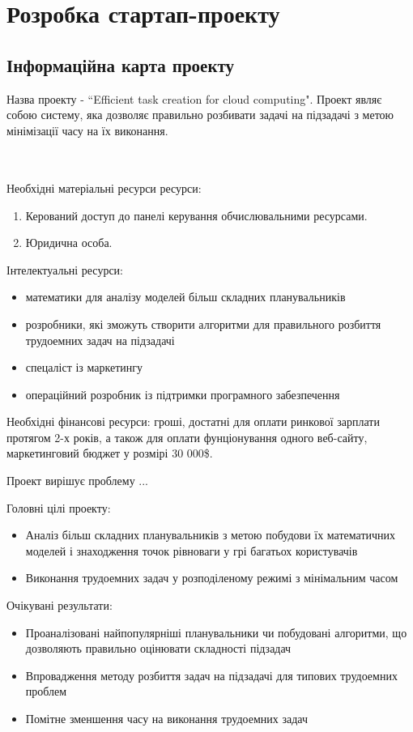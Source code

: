 \chapter{Розробка стартап-проекту}
\section{Інформаційна карта проекту}
Назва проекту - ``Efficient task creation for cloud computing". Проект являє собою систему, яка дозволяє правильно розбивати задачі на підзадачі з метою мінімізації часу на їх виконання.
\begin{tabular}
  {|l|p{8cm}|}
\hline

\end{tabular}
\\
Необхідні матеріальні ресурси ресурси:
\begin{enumerate}
\item Керований доступ до панелі керування обчислювальними ресурсами.
\item Юридична особа.
\end{enumerate}
Інтелектуальні ресурси:
\begin{itemize}
  \item математики для аналізу моделей більш складних планувальників
  \item розробники, які зможуть створити алгоритми для правильного розбиття трудоемних задач на підзадачі
  \item спецаліст із маркетингу
  \item операційний розробник із підтримки програмного забезпечення
\end{itemize}
Необхідні фінансові ресурси: гроші, достатні для оплати ринкової зарплати протягом 2-х років, а також для оплати фунціонування одного веб-сайту, маркетинговий бюджет у розмірі 30 000\$.

Проект вирішує проблему ...

Головні цілі проекту:
\begin{itemize}
  \item Аналіз більш складних планувальників з метою побудови їх математичних моделей і знаходження точок рівноваги у грі багатьох користувачів
  \item Виконання трудоемних задач у розподіленому режимі з мінімальним часом
\end{itemize}

Очікувані результати:
\begin{itemize}
  \item Проаналізовані найпопулярніші планувальники чи побудовані алгоритми, що дозволяють правильно оцінювати складності підзадач
  \item Впровадження методу розбиття задач на підзадачі для типових трудоемних проблем
  \item Помітне зменшення часу на виконання трудоемних задач
\end{itemize}

